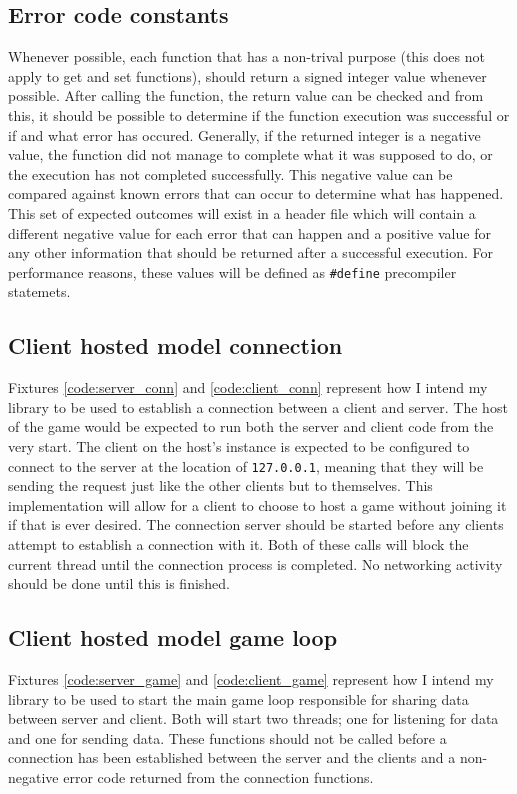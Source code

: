 \subsection{Error code constants}
Whenever possible, each function that has a non-trival purpose (this does not apply to get and set functions), should return a signed integer value whenever possible. After calling the function, the return value can be checked and from this, it should be possible to determine if the function execution was successful or if and what error has occured. Generally, if the returned integer is a negative value, the function did not manage to complete what it was supposed to do, or the execution has not completed successfully. This negative value can be compared against known errors that can occur to determine what has happened. This set of expected outcomes will exist in a header file which will contain a different negative value for each error that can happen and a positive value for any other information that should be returned after a successful execution. For performance reasons, these values will be defined as \lstinline{#define} precompiler statemets.


\newpage
\subsection{Client hosted model connection}
Fixtures \ref{code:server_conn} and \ref{code:client_conn} represent how I intend my library to be used to establish a connection between a client and server. The host of the game would be expected to run both the server and client code from the very start. The client on the host's instance is expected to be configured to connect to the server at the location of \lstinline{127.0.0.1}, meaning that they will be sending the request just like the other clients but to themselves. This implementation will allow for a client to choose to host a game without joining it if that is ever desired. The connection server should be started before any clients attempt to establish a connection with it. Both of these calls will block the current thread until the connection process is completed. No networking activity should be done until this is finished.




\newpage
\subsection{Client hosted model game loop}
Fixtures \ref{code:server_game} and \ref{code:client_game} represent how I intend my library to be used to start the main game loop responsible for sharing data between server and client. Both will start two threads; one for listening for data and one for sending data. These functions should not be called before a connection has been established between the server and the clients and a non-negative error code returned from the connection functions.

